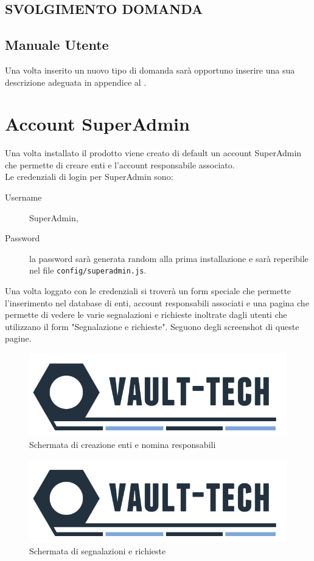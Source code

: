 \documentclass[a4paper, titlepage]{article}
\begin{document}
	\subsection{SVOLGIMENTO DOMANDA}
	
	\subsection{Manuale Utente}
	Una volta inserito un nuovo tipo di domanda sarà opportuno inserire una sua descrizione adeguata in appendice al .
	
	\newpage
	\section{Account SuperAdmin} %
	Una volta installato il prodotto viene creato di default un account SuperAdmin che permette di creare enti e l'account responsabile associato. 
	\\ Le credenziali di login per SuperAdmin sono:
	\begin{description}
		\item[Username] SuperAdmin,
		\item[Password] la password sarà generata random alla prima installazione e sarà reperibile nel file \texttt{config/superadmin.js}.
	\end{description}
	Una volta loggato con le credenziali si troverà un form speciale che permette l'inserimento nel database di enti, account responsabili associati e una pagina che permette di vedere le varie segnalazioni e richieste inoltrate dagli utenti che utilizzano il form "Segnalazione e richieste". Seguono degli screenshot di queste pagine.
	
	\begin{figure}[!h]
		\centering
		\includegraphics[scale=0.5]{Img/logo.png}
		\caption{Schermata di creazione enti e nomina responsabili}
	\end{figure}
	
	\begin{figure}[!h]
		\centering
		\includegraphics[scale=0.5]{Img/logo.png}
		\caption{Schermata di segnalazioni e richieste}
	\end{figure}
	
\end{document}
